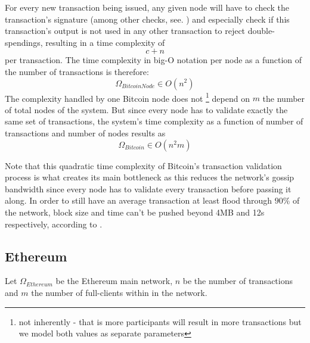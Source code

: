 \documentclass[twocolumn,showpacs,
  nofootinbib,aps,superscriptaddress,
  eqsecnum,prd,notitlepage,showkeys,10pt]{revtex4-1}
\begin{document}
For every new transaction being issued, any given node will have to check the transaction's signature (among other checks, see. \cite{bitcoin-protocol}) and especially check if this transaction's output is not used in any other transaction to reject double-spendings, resulting in a time complexity of
\begin{equation}
c+n
\end{equation}
per transaction. The time complexity in big-O notation per node as a function of the number of transactions is therefore:
\begin{equation}
\Omega_{BitcoinNode}\in O(n^2)
\end{equation}
The complexity handled by one Bitcoin node does not \footnote{not inherently - that is more participants will result in more transactions but we model both values as separate parameters} depend on $m$ the number of total nodes of the system. But since every node has to validate exactly the same set of transactions, the system's time complexity as a function of number of transactions and number of nodes results as
\begin{equation}
\Omega_{Bitcoin}\in O(n^2m)
\end{equation}

Note that this quadratic time complexity of Bitcoin's transaction validation process is what creates its main bottleneck as this reduces the network's gossip bandwidth since every node has to validate every transaction before passing it along. In order to still have an average transaction at least flood through $90\%$ of the network, block size and time can't be pushed beyond 4MB and 12s respectively, according to \cite{scaling}.

\subsection{Ethereum}
Let $\Omega_{Ethereum}$ be the Ethereum main network, $n$ be the number of transactions and $m$ the number of full-clients within in the network.
\end{document}
